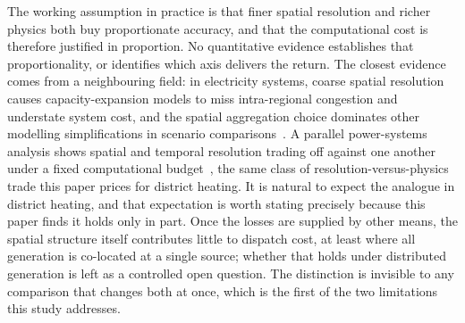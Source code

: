 The working assumption in practice is that finer spatial resolution and richer physics
both buy proportionate accuracy, and that the computational cost is therefore justified in
proportion. No quantitative evidence establishes that proportionality, or identifies which
axis delivers the return. The closest evidence comes from a neighbouring field: in
electricity systems, coarse spatial resolution causes capacity-expansion models to miss
intra-regional congestion and understate system cost, and the spatial aggregation choice
dominates other modelling simplifications in scenario
comparisons~\cite{Frysztacki2021}. A parallel power-systems analysis shows spatial and
temporal resolution trading off against one another under a fixed computational
budget~\citep{FrewJacobson2016}, the same class of resolution-versus-physics trade this
paper prices for district heating. It is natural to expect the analogue in district
heating, and that expectation is worth stating precisely because this paper finds it
holds only in part. Once the losses are supplied by other means, the spatial structure itself
contributes little to dispatch cost, at least where all generation is co-located at a
single source; whether that holds under distributed generation is left as a
controlled open question. The distinction is
invisible to any comparison that changes both at once, which is the first of the two
limitations this study addresses.
